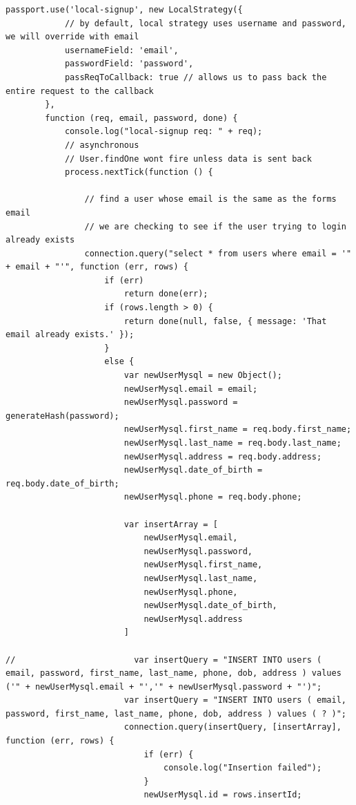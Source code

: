 \documentclass[a4paper]{article}
\begin{document}
\begin{lstlisting}[style=htmlcssjs]
    passport.use('local-signup', new LocalStrategy({
            // by default, local strategy uses username and password, we will override with email
            usernameField: 'email',
            passwordField: 'password',
            passReqToCallback: true // allows us to pass back the entire request to the callback
        },
        function (req, email, password, done) {
            console.log("local-signup req: " + req);
            // asynchronous
            // User.findOne wont fire unless data is sent back
            process.nextTick(function () {

                // find a user whose email is the same as the forms email
                // we are checking to see if the user trying to login already exists
                connection.query("select * from users where email = '" + email + "'", function (err, rows) {
                    if (err)
                        return done(err);
                    if (rows.length > 0) {
                        return done(null, false, { message: 'That email already exists.' });
                    }
                    else {
                        var newUserMysql = new Object();
                        newUserMysql.email = email;
                        newUserMysql.password = generateHash(password);
                        newUserMysql.first_name = req.body.first_name;
                        newUserMysql.last_name = req.body.last_name;
                        newUserMysql.address = req.body.address;
                        newUserMysql.date_of_birth = req.body.date_of_birth;
                        newUserMysql.phone = req.body.phone;

                        var insertArray = [
                            newUserMysql.email,
                            newUserMysql.password,
                            newUserMysql.first_name,
                            newUserMysql.last_name,
                            newUserMysql.phone,
                            newUserMysql.date_of_birth,
                            newUserMysql.address
                        ]

//                        var insertQuery = "INSERT INTO users ( email, password, first_name, last_name, phone, dob, address ) values ('" + newUserMysql.email + "','" + newUserMysql.password + "')";
                        var insertQuery = "INSERT INTO users ( email, password, first_name, last_name, phone, dob, address ) values ( ? )";
                        connection.query(insertQuery, [insertArray], function (err, rows) {
                            if (err) {
                                console.log("Insertion failed");
                            }
                            newUserMysql.id = rows.insertId;


\end{lstlisting}
\end{document}
